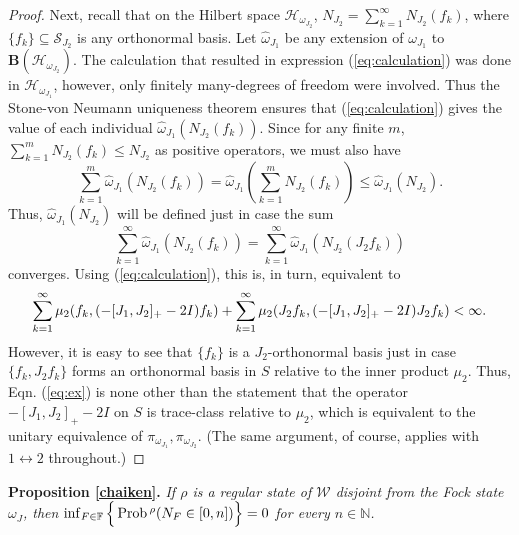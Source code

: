 \documentclass[12pt]{article}
\theoremstyle{remark}
\theoremstyle{definition}
\newcommand{\fin}{\mathbb{F}}
\newcommand{\alg}[1]{\mathcal{#1}}
\newcommand{\hil}[1]{\mathcal{#1}}
\begin{document}
\begin{proof}
Next, recall that on the Hilbert space $\hil{H}_{\omega_{J_{2}}}$, $N_{J _{2}}=
\sum_{k=1}^{\infty }N_{J _{2}}(f_{k})$, where $\{f_{k}\}\subseteq 
\hil{S}_{J_{2}}$ is any orthonormal basis.   Let 
$\widehat{\omega}_{J_{1}}$ be any extension of $\omega_{J_{1}}$ to 
$\mathbf{B}(\hil{H}_{\omega_{J_{2}}})$.  The calculation that resulted in 
expression (\ref{eq:calculation}) was done in $\hil{H}_{\omega_{J_{1}}}$, 
however, only finitely many-degrees of freedom were involved.  Thus 
the Stone-von Neumann uniqueness theorem ensures that 
(\ref{eq:calculation}) gives the 
value of each individual $\widehat{\omega}_{J_{1}}(N_{J_{2}}(f_{k}))$. 
Since for any finite $m$, $\sum_{k=1}^{m}N_{J
_{2}}(f_{k})\leq N_{J _{2}}$ as positive operators, we must also have 
\begin{equation}
\sum_{k=1}^{m}\widehat{\omega }_{J_{1}}(N_{J _{2}}(f_{k}))=\widehat{\omega }
_{J_{1}}\left( \sum_{k=1}^{m}N_{J _{2}}(f_{k})\right) \leq \widehat{\omega }%
_{J_{1}}(N_{J_{2}}).
\end{equation}  Thus, $\widehat{\omega }_{J_{1}}(N_{J_{2}})$ will be defined 
just in case the sum 
\begin{equation} \label{eq:sum}
\sum_{k=1}^{\infty }\widehat{
\omega }_{J_{1}}(N_{J _{2}}(f_{k}))=\sum_{k=1}^{\infty}
\widehat{\omega }_{J_{1}}(N_{J
_{2}}(J_{2}f_{k}))
\end{equation}
 converges.  Using (\ref{eq:calculation}), this is, in turn, equivalent to 
\begin{equation} \label{eq:ex}
\sum_{k=1}^{\infty }\mu 
_{2}(f_{k},(-[J_{1},J_{2}]_{+}-2I)f_{k})+\sum_{k=1}^{%
\infty }\mu _{2}(J_{2}f_{k},(-[J_{1},J_{2}]_{+}-2I)J_{2}f_{k})<\infty.
\end{equation}
However, it is easy to see that $\{f_{k}\}$ is a $J_{2}$-orthonormal basis
just in case $\{f_{k},J_{2}f_{k}\}$ forms an orthonormal basis in 
$S$ relative to the inner product $\mu _{2}$. Thus, Eqn. 
(\ref{eq:ex}) is none other than the statement that the operator 
$-[J_{1},J_{2}]_{+}-2I$ on $S$ is trace-class relative to $\mu_{2}$, which is equivalent to 
the unitary equivalence of 
$\pi_{\omega_{J_{1}}},\pi_{\omega_{J_{2}}}$. (The same argument, of 
course, applies with $1\leftrightarrow 2$ throughout.) \end{proof}

\noindent\textbf{Proposition \ref{chaiken}.} \emph{If $\rho$ is a regular state 
of $\alg{W}$ disjoint from 
the Fock state $\omega _{J}$, then $\inf _{F\in \fin} \, \Bigl\{ \,
    \mathrm{Prob}\,^{\rho}(N_{F}\in [0,n]) \Bigr\} =0$ for every $n\in 
    \mathbb{N}$.}
\end{document}
